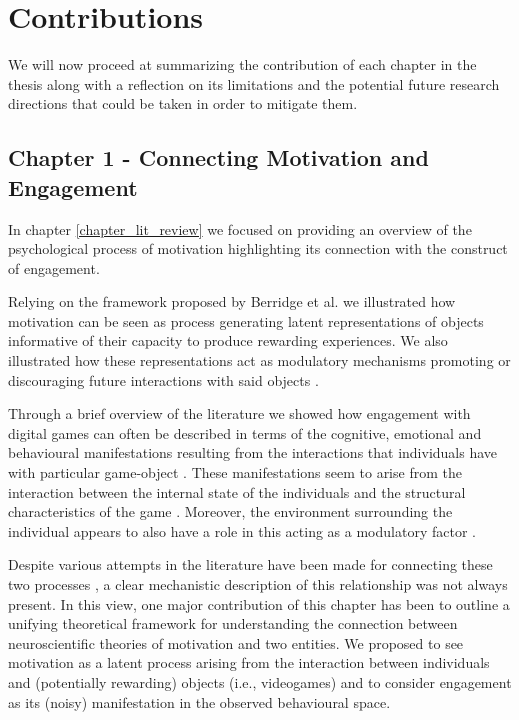 \section{Contributions}

We will now proceed at summarizing the contribution of each chapter in the thesis along with a reflection on its limitations and the potential future research directions that could be taken in order to mitigate them.

\subsection{Chapter 1 - Connecting Motivation and Engagement}
\label{discussion_chapter_one}
In chapter \ref{chapter_lit_review} we focused on providing an overview of the psychological process of motivation highlighting its connection with the construct of engagement.

Relying on the framework proposed by Berridge et al. \cite{berridge1998role} we illustrated how motivation can be seen as process generating latent representations of objects informative of their capacity to produce rewarding experiences. We also illustrated how these representations act as modulatory mechanisms promoting or discouraging future interactions with said objects \cite{berridge2004motivation}.

Through a brief overview of the literature we showed how engagement with digital games can often be described in terms of the cognitive, emotional and behavioural manifestations resulting from the interactions that individuals have with particular game-object \cite{boyle2012engagement, jennett2008measuring, przybylski2010motivational}. These manifestations seem to arise from the interaction between the internal state of the individuals and the structural characteristics of the game \cite{lucas2004sex,o2008user,jennett2008measuring,boyle2012engagement,connolly2012systematic,csikszentmihalyi2014toward}. Moreover, the environment surrounding the individual appears to also have a role in this acting as a modulatory factor \cite{o2008user, bialas2014cultural, vihanga2019weekly, zendle2022transnational}.

Despite various attempts in the literature have been made for connecting these two processes \cite{przybylski2010motivational, nacke2011brainhex, deterding2022mastering}, a clear mechanistic description of this relationship was not always present. In this view, one major contribution of this chapter has been to outline a unifying theoretical framework for understanding the connection between neuroscientific theories of motivation and  two entities. We proposed to see motivation as a latent process arising from the interaction between individuals and (potentially rewarding) objects (i.e., videogames) and to consider engagement as its (noisy) manifestation in the observed behavioural space. 


